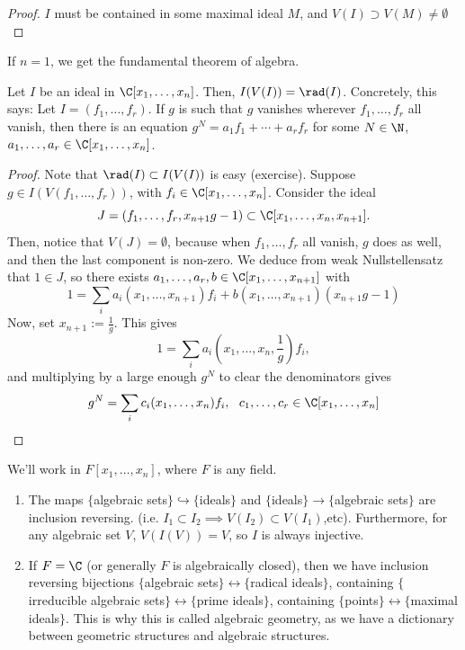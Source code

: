 \begin{proof}
    $I$ must be contained in some maximal ideal $M$, and $V(I) \supset V(M) \neq \emptyset$
\end{proof}

\begin{cor}
    If $n=1$, we get the fundamental theorem of algebra.
\end{cor}

\begin{thm}
    Let $I$ be an ideal in $\C[x_1,\dots,x_n]$. Then, $I(V(I))=\rad (I)$. Concretely, this says: Let $I=(f_1,\dots,f_r)$. If $g$ is such that $g$ vanishes wherever $f_1,\dots,f_r$ all vanish, then there is an equation $g^N=a_1f_1+\cdots +a_rf_r$ for some $N \in \N$, $a_1,\dots,a_r \in \C[x_1,\dots,x_n]$.
\end{thm}

\begin{proof}
    Note that $\rad (I) \subset I(V(I))$ is easy (exercise). Suppose $g \in I(V(f_1,\dots,f_r))$, with $f_i \in \C[x_1,\dots,x_n]$. Consider the ideal
    $$J=(f_1,\dots,f_r,x_{n+1}g-1) \subset \C[x_1,\dots,x_n,x_{n+1}].$$
    Then, notice that $V(J)=\emptyset$, because when $f_1,\dots,f_r$ all vanish, $g$ does as well, and then the last component is non-zero. We deduce from weak Nullstellensatz that $1 \in J$, so there exists $a_1,\dots,a_r,b \in \C[x_1,\dots,x_{n+1}]$ with
    $$1 = \sum_{i}a_i(x_1,\dots,x_{n+1})f_i+b(x_1,\dots,x_{n+1})(x_{n+1}g-1)$$
    Now, set $x_{n+1}:= \frac{1}{g}$. This gives
    $$1 = \sum_{i} a_i(x_1,\dots,x_n,\frac{1}{g})f_i,$$
    and multiplying by a large enough $g^N$ to clear the denominators gives
    $$g^N = \sum_ic_i(x_1,\dots,x_n)f_i,\:\:\:c_1,\dots,c_r \in \C[x_1,\dots,x_n]$$
\end{proof}

\begin{cor}
    We'll work in $F[x_1,\dots,x_n]$, where $F$ is any field.
    \begin{enumerate}
        \item The maps $\{$algebraic sets$\} \hookrightarrow \{$ideals$\}$ and $\{$ideals$\} \to \{$algebraic sets$\}$ are inclusion reversing. (i.e. $I_1 \subset I_2 \implies V(I_2)\subset V(I_1)$,etc). Furthermore, for any algebraic set $V$, $V(I(V))=V$, so $I$ is always injective.
        \item If $F=\C$ (or generally $F$ is algebraically closed), then we have inclusion reversing bijections $\{$algebraic sets$\} \longleftrightarrow \{$radical ideals$\}$, containing $\{$irreducible algebraic sets$\} \longleftrightarrow \{$prime ideals$\}$, containing $\{$points$\} \longleftrightarrow \{$maximal ideals$\}$. This is why this is called algebraic geometry, as we have a dictionary between geometric structures and algebraic structures.
    \end{enumerate}
\end{cor}
